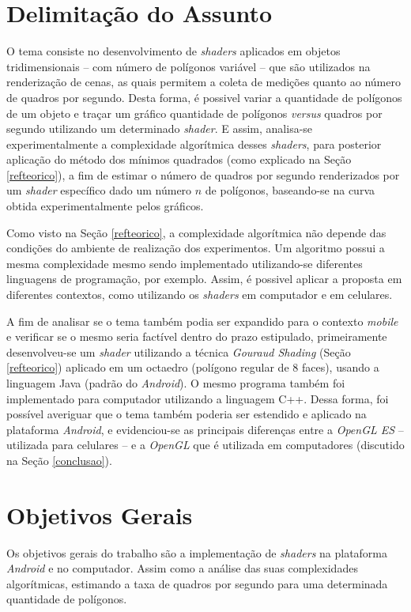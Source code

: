 \section{Delimitação do Assunto}

O tema consiste no desenvolvimento de \textit{shaders} aplicados em objetos tridimensionais -- com número de polígonos variável -- que são utilizados na renderização de cenas, as quais permitem a coleta de medições quanto ao número de quadros por segundo. Desta forma, é possivel variar a quantidade de polígonos de um objeto e traçar um gráfico quantidade de polígonos \textit{versus} quadros por segundo utilizando um determinado \textit{shader}. E assim, analisa-se experimentalmente a complexidade algorítmica desses \textit{shaders}, para posterior aplicação do método dos mínimos quadrados (como explicado na Seção \ref{refteorico}), a fim de estimar o número de quadros por segundo renderizados por um \textit{shader} específico dado um número $n$ de polígonos, baseando-se na curva obtida experimentalmente pelos gráficos.  

Como visto na Seção \ref{refteorico}, a complexidade algorítmica não depende das condições do ambiente de realização dos experimentos. Um algoritmo possui a mesma complexidade mesmo sendo implementado utilizando-se diferentes linguagens de programação, por exemplo. Assim, é possivel aplicar a proposta em diferentes contextos, como utilizando os \textit{shaders} em computador e em celulares. 

A fim de analisar se o tema também podia ser expandido para o contexto \textit{mobile} e verificar se o mesmo seria factível dentro do prazo estipulado, primeiramente desenvolveu-se um \textit{shader} utilizando a técnica \textit{Gouraud Shading} (Seção \ref{refteorico}) aplicado em um octaedro (polígono regular de 8 faces), usando a linguagem Java (padrão do \textit{Android}). O mesmo programa também foi implementado para computador utilizando a linguagem C++.  Dessa forma, foi possível averiguar que o tema também poderia ser estendido e aplicado na plataforma \textit{Android}, e evidenciou-se as principais diferenças entre a \textit{OpenGL ES} -- utilizada para celulares -- e a \textit{OpenGL} que é utilizada em computadores (discutido na Seção \ref{conclusao}). 


\section{Objetivos Gerais}

Os objetivos gerais do trabalho são a implementação de \textit{shaders} na plataforma \textit{Android} e no computador. Assim como a análise das suas complexidades algorítmicas, estimando a taxa de quadros por segundo para uma determinada quantidade de polígonos.

